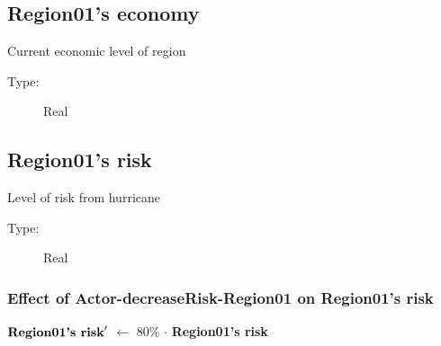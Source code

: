 \documentclass{article}%
\begin{document}
%
\subsection{Region01's economy}%
\label{subsec:Region01's economy}%
Current economic level of region%
\begin{description}%
\item[Type:]%
Real%
\end{description}

%
\subsection{Region01's risk}%
\label{subsec:Region01's risk}%
Level of risk from hurricane%
\begin{description}%
\item[Type:]%
Real%
\end{description}%
\subsubsection{Effect of Actor{-}decreaseRisk{-}Region01 on Region01's risk}%
\label{ssubsec:Effect of Actor{-}decreaseRisk{-}Region01 on Region01's risk}%
\begin{flushleft}%
$\mbox{\textbf{Region01's risk}} '$%
$\leftarrow$%
80\%%
$\cdot$%
\textbf{Region01's risk}%
\end{flushleft}

%
\end{document}
